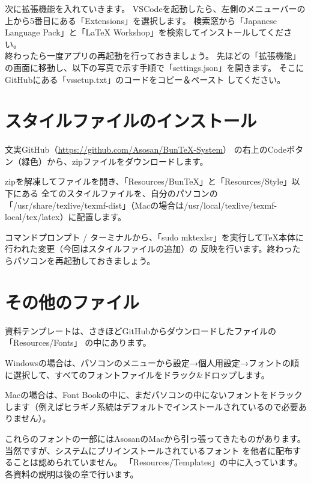 \begin{multicols*}{2}
次に拡張機能を入れていきます。
VSCodeを起動したら、左側のメニューバーの上から5番目にある「Extensions」を選択します。
検索窓から「Japanese Language Pack」と「LaTeX Workshop」を検索してインストールしてください。\\
終わったら一度アプリの再起動を行っておきましょう。
先ほどの「拡張機能」の画面に移動し、以下の写真で示す手順で「settings.json」を開きます。
そこにGitHubにある「vssetup.txt」のコードをコピー＆ペースト
してください。


\section{\BunTeX スタイルファイルのインストール}
文実GitHub（\url{https://github.com/Asosan/BunTeX-System}）
の右上のCodeボタン（緑色）から、zipファイルをダウンロードします。

zipを解凍してファイルを開き、「Resources/BunTeX」と「Resources/Style」以下にある
全てのスタイルファイルを、自分のパソコンの「/usr/share/texlive/texmf-dist」（Macの場合は/usr/local/texlive/texmf-local/tex/latex）に配置します。

コマンドプロンプト / ターミナルから、「sudo mktexlsr」を実行して\TeX 本体に行われた変更（今回はスタイルファイルの追加）の
反映を行います。終わったらパソコンを再起動しておきましょう。


\section{その他のファイル}
資料テンプレートは、さきほどGitHubからダウンロードしたファイルの「Resources/Fonts」
の中にあります。

Windowsの場合は、パソコンのメニューから設定→個人用設定→フォントの順に選択して、すべてのフォントファイルをドラック{\&}ドロップします。

Macの場合は、Font Bookの中に、まだパソコンの中にないフォントをドラックします（例えばヒラギノ系統はデフォルトでインストールされているので必要ありません）。

これらのフォントの一部にはAsosanのMacから引っ張ってきたものがあります。当然ですが、システムにプリインストールされているフォント
を他者に配布することは認められていません。
「Resources/Templates」の中に入っています。
各資料の説明は後の章で行います。



\end{multicols*}
